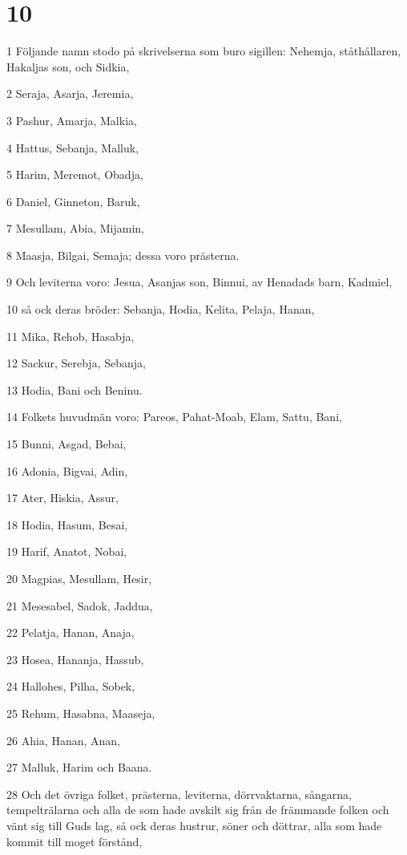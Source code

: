 \chapter{10}

\par 1 Följande namn stodo på skrivelserna som buro sigillen: Nehemja, ståthållaren, Hakaljas son, och Sidkia,
\par 2 Seraja, Asarja, Jeremia,
\par 3 Pashur, Amarja, Malkia,
\par 4 Hattus, Sebanja, Malluk,
\par 5 Harim, Meremot, Obadja,
\par 6 Daniel, Ginneton, Baruk,
\par 7 Mesullam, Abia, Mijamin,
\par 8 Maasja, Bilgai, Semaja; dessa voro prästerna.
\par 9 Och leviterna voro: Jesua, Asanjas son, Binnui, av Henadads barn, Kadmiel,
\par 10 så ock deras bröder: Sebanja, Hodia, Kelita, Pelaja, Hanan,
\par 11 Mika, Rehob, Hasabja,
\par 12 Sackur, Serebja, Sebanja,
\par 13 Hodia, Bani och Beninu.
\par 14 Folkets huvudmän voro: Pareos, Pahat-Moab, Elam, Sattu, Bani,
\par 15 Bunni, Asgad, Bebai,
\par 16 Adonia, Bigvai, Adin,
\par 17 Ater, Hiskia, Assur,
\par 18 Hodia, Hasum, Besai,
\par 19 Harif, Anatot, Nobai,
\par 20 Magpias, Mesullam, Hesir,
\par 21 Mesesabel, Sadok, Jaddua,
\par 22 Pelatja, Hanan, Anaja,
\par 23 Hosea, Hananja, Hassub,
\par 24 Hallohes, Pilha, Sobek,
\par 25 Rehum, Hasabna, Maaseja,
\par 26 Ahia, Hanan, Anan,
\par 27 Malluk, Harim och Baana.
\par 28 Och det övriga folket, prästerna, leviterna, dörrvaktarna, sångarna, tempelträlarna och alla de som hade avskilt sig från de främmande folken och vänt sig till Guds lag, så ock deras hustrur, söner och döttrar, alla som hade kommit till moget förstånd,
